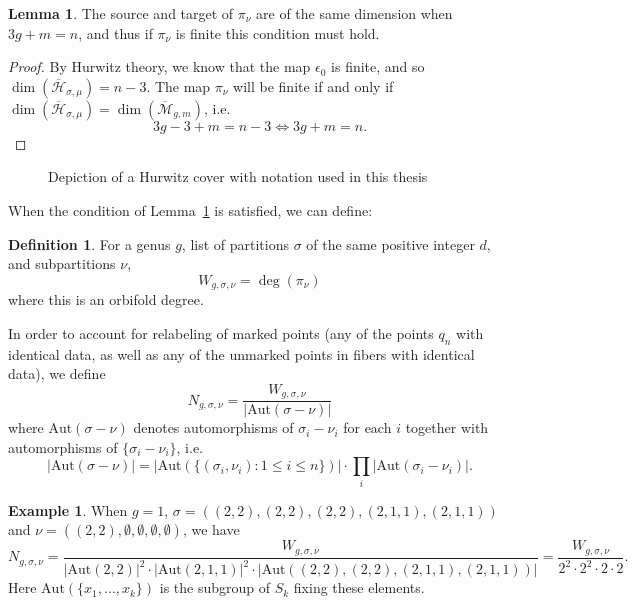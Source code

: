\documentclass[thesis]{thesis-umich}           %
\newcommand{\mb}{\overline{\mathcal M}}
\newcommand{\Aut}{\text{Aut}}
\newcommand{\Hb}{\overline{\mathcal H}}
\theoremstyle{definition}
\newtheorem{dfn}[thm]{Definition}
\newtheorem{lem}[thm]{Lemma}
\newtheorem{eg}[thm]{Example}
\begin{document}
\begin{lem}
  \label{lem:dim}
  The source and target of $\pi_{\nu}$ are of the same dimension when $3g+m=n$,
  and thus if $\pi_{\nu}$ is finite this condition must hold.
\end{lem}
\begin{proof}
  By Hurwitz theory, we know that the map $\epsilon_0$ is finite, and so $\dim(\Hb_{\sigma,\mu})=n-3$. The map $\pi_{\nu}$ will be finite if and only if
  $\dim(\Hb_{\sigma,\mu})=\dim(\mb_{g,m})$, i.e.
  \[
  3g-3+m=n-3\iff 3g+m=n.
  \]
\end{proof}

\begin{figure}[h]
  \caption{Depiction of a Hurwitz cover with notation used in this thesis}
  \centering
{}

\label{fig:hurwitz}
\end{figure}

When the condition of Lemma~\ref{lem:dim} is satisfied, we can define:
\begin{dfn}
  For a genus $g$, list of partitions $\sigma$ of the
  same positive integer $d$, and subpartitions $\nu$,
\[
W_{g,\sigma,\nu}=\deg(\pi_{\nu})
\]
where this is an orbifold degree.
\end{dfn}
In order to account for relabeling of marked points (any of the points $q_n$ with identical data, as well as any of the unmarked points in fibers with
identical data), we define
\[
N_{g,\sigma,\nu}=\frac{W_{g,\sigma,\nu}}{|\Aut(\sigma-\nu)|}
\]
where $\Aut(\sigma-\nu)$ denotes automorphisms of $\sigma_i-\nu_i$ for each $i$ together with automorphisms of $\{\sigma_i-\nu_i\}$, i.e.
\[
|\Aut(\sigma-\nu)|=|\Aut(\{(\sigma_i,\nu_i):1\leq i\leq n\})|\cdot \prod_i|\Aut(\sigma_i-\nu_i)|.
\]
\begin{eg}
  When $g=1$, $\sigma=((2,2),(2,2),(2,2),(2,1,1),(2,1,1))$ and $\nu=((2,2),\emptyset,\emptyset,\emptyset,\emptyset)$, we have
  \[
  N_{g,\sigma,\nu}=\frac{W_{g,\sigma,\nu}}{|\Aut(2,2)|^2\cdot |\Aut(2,1,1)|^2\cdot |\Aut((2,2),(2,2),(2,1,1),(2,1,1))|}=\frac{W_{g,\sigma,\nu}}{2^2\cdot 2^2\cdot 2\cdot 2}.
  \]
  Here $\Aut(\{x_1,\dots,x_k\})$ is the subgroup of $S_k$ fixing these elements.
  \end{eg}
\end{document}
